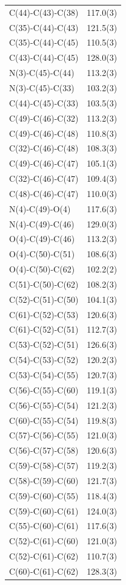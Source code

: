 \begin{center}
{\begin{supertabular}{p{1.5in}c}
C(44)-C(43)-C(38)&117.0(3)\\
C(35)-C(44)-C(43)&121.5(3)\\
C(35)-C(44)-C(45)&110.5(3)\\
C(43)-C(44)-C(45)&128.0(3)\\
N(3)-C(45)-C(44)&113.2(3)\\
N(3)-C(45)-C(33)&103.2(3)\\
C(44)-C(45)-C(33)&103.5(3)\\
C(49)-C(46)-C(32)&113.2(3)\\
C(49)-C(46)-C(48)&110.8(3)\\
C(32)-C(46)-C(48)&108.3(3)\\
C(49)-C(46)-C(47)&105.1(3)\\
C(32)-C(46)-C(47)&109.4(3)\\
C(48)-C(46)-C(47)&110.0(3)\\
N(4)-C(49)-O(4)&117.6(3)\\
N(4)-C(49)-C(46)&129.0(3)\\
O(4)-C(49)-C(46)&113.2(3)\\
O(4)-C(50)-C(51)&108.6(3)\\
O(4)-C(50)-C(62)&102.2(2)\\
C(51)-C(50)-C(62)&108.2(3)\\
C(52)-C(51)-C(50)&104.1(3)\\
C(61)-C(52)-C(53)&120.6(3)\\
C(61)-C(52)-C(51)&112.7(3)\\
C(53)-C(52)-C(51)&126.6(3)\\
C(54)-C(53)-C(52)&120.2(3)\\
C(53)-C(54)-C(55)&120.7(3)\\
C(56)-C(55)-C(60)&119.1(3)\\
C(56)-C(55)-C(54)&121.2(3)\\
C(60)-C(55)-C(54)&119.8(3)\\
C(57)-C(56)-C(55)&121.0(3)\\
C(56)-C(57)-C(58)&120.6(3)\\
C(59)-C(58)-C(57)&119.2(3)\\
C(58)-C(59)-C(60)&121.7(3)\\
C(59)-C(60)-C(55)&118.4(3)\\
C(59)-C(60)-C(61)&124.0(3)\\
C(55)-C(60)-C(61)&117.6(3)\\
C(52)-C(61)-C(60)&121.0(3)\\
C(52)-C(61)-C(62)&110.7(3)\\
C(60)-C(61)-C(62)&128.3(3)\\

\end{supertabular}}
\end{center}
